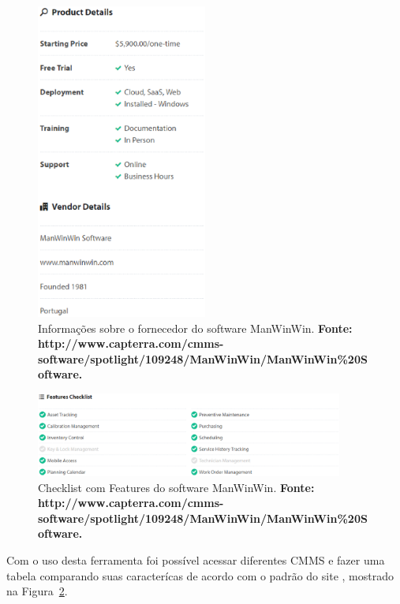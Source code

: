 \graphicspath{{figuras/}}
\begin{figure}[h]
\centering
\includegraphics[width=0.5\textwidth]{informacao_capterra.eps}
\caption{Informações sobre o fornecedor do software ManWinWin. \textbf{Fonte: http://www.capterra.com/cmms-software/spotlight/109248/ManWinWin/ManWinWin\%20Software.}}
\label{informaca_capterra}
\end{figure}


\graphicspath{{figuras/}}
\begin{figure}[h]
\centering
\includegraphics[width=0.9\textwidth]{checklist_capterra.eps}
\caption{Checklist com Features do software ManWinWin. \textbf{Fonte: http://www.capterra.com/cmms-software/spotlight/109248/ManWinWin/ManWinWin\%20Software.}}
\label{checklist_capterra}
\end{figure}

Com o uso desta ferramenta foi possível acessar diferentes CMMS e fazer uma tabela comparando suas caracterícas de acordo com o padrão do site \cite{capterra}, mostrado na Figura~\ref{checklist_capterra}. 

